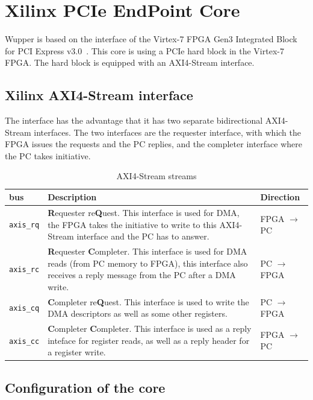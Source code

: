 \section{Xilinx PCIe EndPoint Core}

Wupper is based on the interface of the Virtex-7 FPGA Gen3 Integrated Block for PCI Express v3.0~\cite{pg023}. This core is using a PCIe hard block in the Virtex-7 FPGA. The hard block is equipped with an AXI4-Stream interface.
\subsection{Xilinx AXI4-Stream interface}
The interface has the advantage that it has two separate bidirectional AXI4-Stream interfaces. The two interfaces are the requester interface, with which the FPGA issues the requests and the PC replies, and the completer interface where the PC takes initiative.
\begin{table}[H]
	\centering
	\begin{tabularx}{\textwidth}{|l|X|l|}
	\hline
	  \textbf{bus} & \textbf{Description} &\textbf{Direction}\\
	\hline
	\texttt{axis\_rq} & \textbf{R}equester re\textbf{Q}uest. This interface is used for DMA, the FPGA takes the initiative to write to this AXI4-Stream interface and the PC has to answer. &FPGA $\rightarrow$ PC\\
	\hline
	\texttt{axis\_rc} & \textbf{R}equester \textbf{C}ompleter. This interface is used for DMA reads (from PC memory to FPGA), this interface also receives a reply message from the PC after a DMA write.&PC $\rightarrow$ FPGA\\
	\hline
	\texttt{axis\_cq} & \textbf{C}ompleter re\textbf{Q}uest. This interface is used to write the DMA descriptors as well as some other registers. & PC $\rightarrow$ FPGA\\
	\hline
	\texttt{axis\_cc} & \textbf{C}ompleter \textbf{C}ompleter. This interface is used as a reply inteface for register reads, as well as a reply header for a register write. & FPGA $\rightarrow$ PC\\
	\hline	
	\end{tabularx}
	\caption{AXI4-Stream streams}\label{tab:axi_streams}
\end{table}

\subsection{Configuration of the core}

